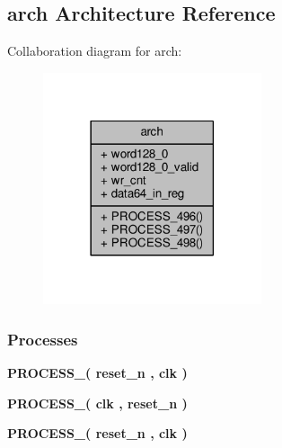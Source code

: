 \subsection{arch Architecture Reference}
\label{classunpack__64__to__64_1_1arch}


Collaboration diagram for arch\+:\nopagebreak
\begin{figure}[H]
\begin{center}
\leavevmode
\includegraphics[width=182pt]{d6/d76/classunpack__64__to__64_1_1arch__coll__graph}
\end{center}
\end{figure}
\subsubsection*{Processes}
 \begin{DoxyCompactItemize}
\item 
{\bf P\+R\+O\+C\+E\+S\+S\+\_}{\bfseries  ( {\bfseries {\bfseries {\bf reset\+\_\+n}} \textcolor{vhdlchar}{ }} , {\bfseries {\bfseries {\bf clk}} \textcolor{vhdlchar}{ }} )}
\item 
{\bf P\+R\+O\+C\+E\+S\+S\+\_}{\bfseries  ( {\bfseries {\bfseries {\bf clk}} \textcolor{vhdlchar}{ }} , {\bfseries {\bfseries {\bf reset\+\_\+n}} \textcolor{vhdlchar}{ }} )}
\item 
{\bf P\+R\+O\+C\+E\+S\+S\+\_}{\bfseries  ( {\bfseries {\bfseries {\bf reset\+\_\+n}} \textcolor{vhdlchar}{ }} , {\bfseries {\bfseries {\bf clk}} \textcolor{vhdlchar}{ }} )}
\end{DoxyCompactItemize}
